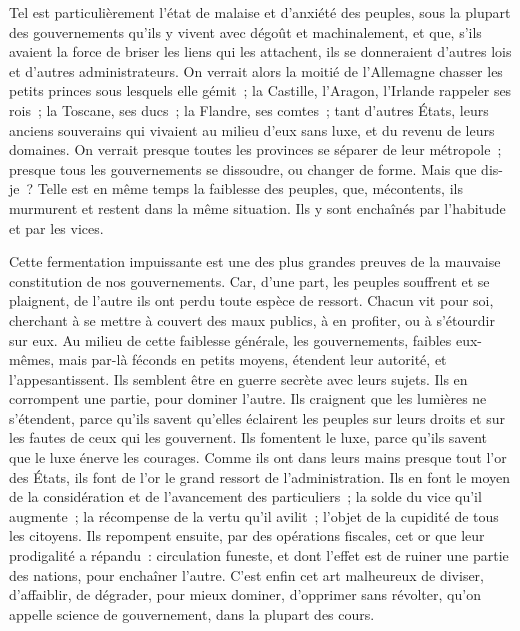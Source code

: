 \documentclass[french,twoside]{book} %
\begin{document}
Tel est particulièrement l’état de malaise et d’anxiété des peuples, sous la plupart des gouvernements qu’ils y vivent avec dégoût et machinalement, et que, s’ils avaient la force de briser les liens qui les attachent, ils se donneraient d’autres lois et d’autres administrateurs. On verrait alors la moitié de l’Allemagne chasser les petits princes sous lesquels elle gémit ; la Castille, l’Aragon, l’Irlande rappeler ses rois ; la Toscane, ses ducs ; la Flandre, ses comtes ; tant d’autres États, leurs anciens souverains qui vivaient au milieu d’eux sans luxe, et du revenu de leurs domaines. On verrait presque toutes les provinces se séparer de leur métropole ; presque tous les gouvernements se dissoudre, ou changer de forme. Mais que dis-je ? Telle est en même temps la faiblesse des peuples, que, mécontents, ils murmurent et restent dans la même situation. Ils y sont enchaînés par l’habitude et par les vices.\par
Cette fermentation impuissante est une des plus grandes preuves de la mauvaise constitution de nos gouvernements. Car, d’une part, les peuples souffrent et se plaignent, de l’autre ils ont perdu toute espèce de ressort. Chacun vit pour soi, cherchant à se mettre à couvert des maux publics, à en profiter, ou à s’étourdir sur eux. Au milieu de cette faiblesse générale, les gouvernements, faibles eux-mêmes, mais par-là féconds en petits moyens, étendent leur autorité, et l’appesantissent. Ils semblent être en guerre secrète avec leurs sujets. Ils en corrompent une partie, pour dominer l’autre. Ils craignent que les lumières ne s’étendent, parce qu’ils savent qu’elles éclairent les peuples sur leurs droits et sur les fautes de ceux qui les gouvernent. Ils fomentent le luxe, parce qu’ils savent que le luxe énerve les courages. Comme ils ont dans leurs mains presque tout l’or des États, ils font de l’or le grand ressort de l’administration. Ils en font le moyen de la considération et de l’avancement des particuliers ; la solde du vice qu’il augmente ; la récompense de la vertu qu’il avilit ; l’objet de la cupidité de tous les citoyens. Ils repompent ensuite, par des opérations fiscales, cet or que leur prodigalité a répandu : circulation funeste, et dont l’effet est de ruiner une partie des nations, pour enchaîner l’autre. C’est enfin cet art malheureux de diviser, d’affaiblir, de dégrader, pour mieux dominer, d’opprimer sans révolter, qu’on appelle science de gouvernement, dans la plupart des cours.\par
\end{document}
